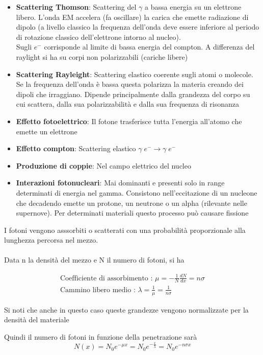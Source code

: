 \begin{itemize}
    \item \textbf{Scattering Thomson}: Scattering del $\gamma$ a bassa energia su un elettrone libero. L'onda EM accelera (fa oscillare) la carica che emette radiazione di dipolo (a livello classico la frequenza dell'onda deve essere inferiore al periodo di rotazione classico dell'elettrone intorno al nucleo).
    \\
     Sugli $e^-$ corrisponde al limite di bassa energia del compton.
     A differenza del raylight si ha su corpi non polarizzabili (cariche libere)

    \item \textbf{Scattering Rayleight}: Scattering elastico coerente sugli atomi o molecole. Se la frequenza dell'onda è bassa questa polarizza la materia creando dei dipoli che irraggiano.
    Dipende principalmente dalla grandezza del corpo su cui scattera, dalla sua polarizzabilità e dalla sua frequenza di risonanza

    \item \textbf{Effetto fotoelettrico}: Il fotone trasferisce tutta l'energia all'atomo che emette un elettrone

    \item \textbf{Effetto compton}: Scattering elastico $\gamma \; e^- \to \gamma \; e^-$

    \item \textbf{Produzione di coppie}: Nel campo elettrico del nucleo

    \item \textbf{Interazioni fotonucleari}: Mai dominanti e presenti solo in range determinati di energia nel gamma.
    Consistono nell'eccitazione di un nucleone che decadendo emette un protone, un neutrone o un alpha (rilevante nelle supernove).
    Per determinati materiali questo processo può causare fissione
\end{itemize}
I fotoni vengono asssorbiti o scatterati con una probabilità proporzionale alla lunghezza percorsa nel mezzo.
\\
\\
Data n la densità del mezzo  e N il numero di fotoni, si ha

\[
\begin{gathered}
\text{Coefficiente di assorbimento : }\mu=-\frac{1}{N}\frac{dN}{dx}=n \sigma
\\
\text{Cammino libero medio  :  } \lambda=\frac{1}{\mu}=\frac{1}{n\sigma}
\end{gathered}
\]
\begin{remark}
    Si noti che anche in questo caso queste grandezze vengono normalizzate per la densità del materiale
\end{remark}
Quindi il numero di fotoni in funzione della penetrazione sarà
\[ N(x)=N_0e^{-\mu x}=N_0e^{-\frac{x}{\lambda}}=N_0e^{-n\sigma x} \]

